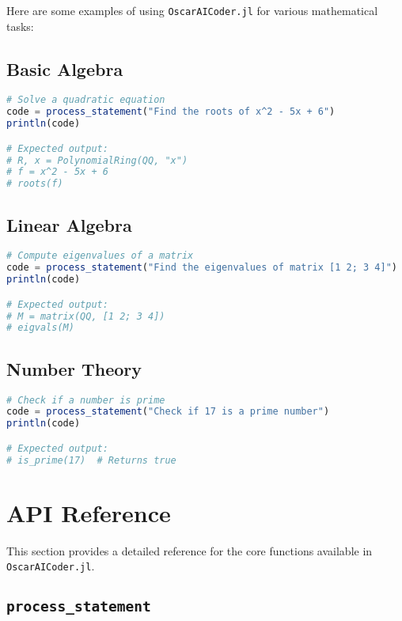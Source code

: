 \documentclass[11pt,a4paper]{article}
\newcommand{\func}[1]{\texttt{#1}}
\newcommand{\modname}[1]{\texttt{#1}}
\begin{document}
Here are some examples of using \modname{OscarAICoder.jl} for various mathematical tasks:

\subsection{Basic Algebra}

\begin{lstlisting}[language=Julia]
# Solve a quadratic equation
code = process_statement("Find the roots of x^2 - 5x + 6")
println(code)

# Expected output:
# R, x = PolynomialRing(QQ, "x")
# f = x^2 - 5x + 6
# roots(f)
\end{lstlisting}

\subsection{Linear Algebra}

\begin{lstlisting}[language=Julia]
# Compute eigenvalues of a matrix
code = process_statement("Find the eigenvalues of matrix [1 2; 3 4]")
println(code)

# Expected output:
# M = matrix(QQ, [1 2; 3 4])
# eigvals(M)
\end{lstlisting}

\subsection{Number Theory}

\begin{lstlisting}[language=Julia]
# Check if a number is prime
code = process_statement("Check if 17 is a prime number")
println(code)

# Expected output:
# is_prime(17)  # Returns true
\end{lstlisting}

\section{API Reference}
\label{sec:api_reference}

This section provides a detailed reference for the core functions available in \modname{OscarAICoder.jl}.

\subsection{\func{process\_statement}}
\label{func:process_statement}
\end{document}
